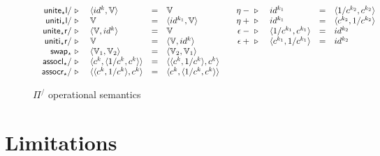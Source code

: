 \documentclass[a4paper,USenglish]{lipics-v2016-utf8x}
\newcommand{\evalone}[2]{#1~\triangleright~#2}
\newcommand{\unitetl}{\mathsf{{unite_{\star}l}}}
\newcommand{\unititl}{\mathsf{{uniti_{\star}l}}}
\newcommand{\unitetr}{\mathsf{{unite_{\star}r}}}
\newcommand{\unititr}{\mathsf{{uniti_{\star}r}}}
\newcommand{\swapt}{\mathsf{{swap_{\star}}}}
\newcommand{\assoclt}{\mathsf{{assocl_{\star}}}}
\newcommand{\assocrt}{\mathsf{{assocr_{\star}}}}
\begin{document}
\begin{figure}[t]
{\footnotesize
\[\begin{array}{cc}
\begin{array}[t]{rlcl}
  \evalone{\unitetl/}{&\langle id^{k},\mathbb{V} \rangle} &=& \mathbb{V} \\
  \evalone{\unititl/}{& \mathbb{V}} &=& \langle id^{k_1},\mathbb{V} \rangle \\
  \evalone{\unitetr/}{&\langle \mathbb{V},id^{k} \rangle} &=& \mathbb{V} \\
  \evalone{\unititr/}{& \mathbb{V}} &=& \langle \mathbb{V},id^{k} \rangle\\
  \evalone{\swapt}{&\langle \mathbb{V}_1, \mathbb{V}_2 \rangle} &=& \langle \mathbb{V}_2, \mathbb{V}_1 \rangle \\
  \evalone{\assoclt/}{&\langle c^k , \langle 1/c^{k}, c^{k} \rangle\rangle} &=& \langle \langle c^k , 1/c^{k} \rangle, c^{k} \rangle \\
  \evalone{\assocrt/}{&\langle \langle c^k , 1/c^{k} \rangle, c^{k} \rangle} &=& \langle c^k , \langle 1/c^{k}, c^{k} \rangle\rangle \\
\end{array}
&
\begin{array}[t]{rlcl}
  \evalone{\eta-}{& id^{k_1}} &=& \langle 1/c^{k_2},c^{k_2} \rangle\\
  \evalone{\eta+}{& id^{k_1}} &=& \langle c^{k_2},1/c^{k_2} \rangle\\
  \evalone{\epsilon-}{& \langle 1/c^{k_1},c^{k_1} \rangle} &=& id^{k_2} \\
  \evalone{\epsilon+}{& \langle c^{k_1},1/c^{k_1} \rangle} &=& id^{k_2} \\
\end{array}

\end{array}\]
\caption{\label{fig:opsem-frac}$\Pi^/$ operational semantics}
}
\end{figure}

\section{Limitations}
\end{document}
